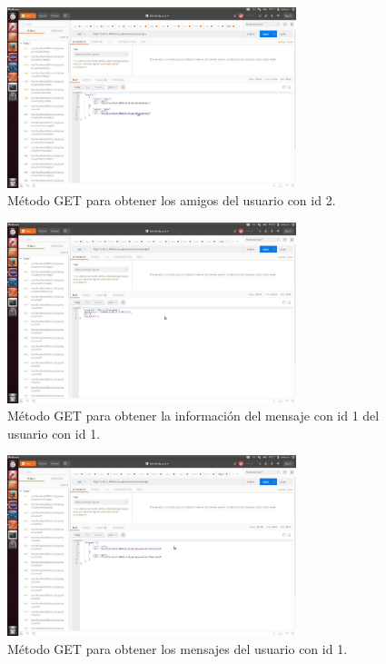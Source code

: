 \documentclass[12pt,a4paper, spanish]{article}
\begin{document}

\begin{figure}[H]
	\centering
	\includegraphics[width=0.75\textwidth]{images/captura6.jpg}
	\caption{Método GET para obtener los amigos del usuario con id 2.}
\end{figure}

\begin{figure}[H]
	\centering
	\includegraphics[width=0.75\textwidth]{images/captura7.jpg}
	\caption{Método GET para obtener la información del mensaje con id 1 del usuario con id 1.}
\end{figure}

\begin{figure}[H]
	\centering
	\includegraphics[width=0.75\textwidth]{images/captura8.jpg}
	\caption{Método GET para obtener los mensajes del usuario con id 1.}
\end{figure}
\end{document}
